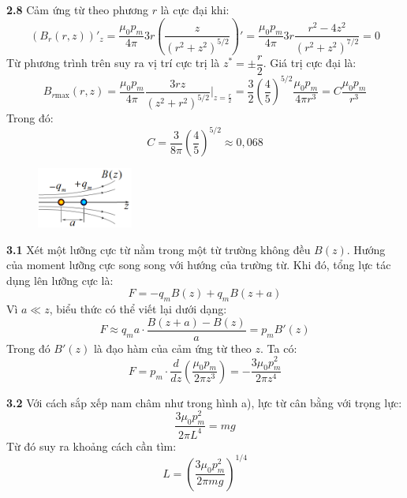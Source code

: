 \noindent\textbf{2.8} Cảm ứng từ theo phương $r$ là cực đại khi:
\begin{equation*}
  \left(B_r(r, z)\right)'_z  = \frac{\mu_0 p_m}{4\pi}  3r \left( \frac{z}{(r^2 + z^2)^{5/2}} \right)'  = \frac{\mu_0 p_m}{4\pi}  3r  \frac{r^2 - 4z^2}{(r^2 + z^2)^{7/2}} = 0
\end{equation*}
Từ phương trình trên suy ra vị trí cực trị là $z^* = \pm \dfrac{r}{2}$. Giá trị cực đại là:
\begin{equation*}
  B_{r\text{max}}(r, z) = \frac{\mu_0 p_m}{4\pi} \frac{3rz}{(z^2 + r^2)^{5/2}} \Big|_{z = \frac{r}{2}}  = \frac{3}{2} \left( \frac{4}{5} \right)^{5/2} \frac{\mu_0 p_m}{4\pi r^3} = C  \frac{\mu_0 p_m}{r^3}
\end{equation*}
Trong đó:
\begin{equation*}
  C = \frac{3}{8\pi} \left( \frac{4}{5} \right)^{5/2} \approx 0{,}068
\end{equation*}

\begin{figure}
  \centering
  \vspace{-0.5cm}
  \includegraphics[width=0.28\textwidth]{Figures/Solutions/Fig 2.7.png}
\end{figure}
\noindent\textbf{3.1} Xét một lưỡng cực từ nằm trong một từ trường không đều $B(z)$. Hướng của moment lưỡng cực song song với hướng của trường từ. Khi đó, tổng lực tác dụng lên lưỡng cực là:
\begin{equation*}
  F = -q_m B(z) + q_m B(z + a)
\end{equation*}
Vì $a \ll z$, biểu thức có thể viết lại dưới dạng:
\begin{equation*}
  F \approx q_m a \cdot \frac{B(z + a) - B(z)}{a} = p_m B'(z)
\end{equation*}
Trong đó $B'(z)$ là đạo hàm của cảm ứng từ theo $z$. Ta có:
\begin{equation*}
  F = p_m \cdot \frac{d}{dz} \left( \frac{\mu_0 p_m}{2\pi z^3} \right) = -\frac{3\mu_0 p_m^2}{2\pi z^4}
\end{equation*}

\noindent\textbf{3.2} Với cách sắp xếp nam châm như trong hình a), lực từ cân bằng với trọng lực:
\begin{equation*}
  \frac{3\mu_0 p_m^2}{2\pi L^4} = mg
\end{equation*}
Từ đó suy ra khoảng cách cần tìm:
\begin{equation*}
  L = \left( \frac{3 \mu_0 p_m^2}{2\pi m g} \right)^{1/4}
\end{equation*}

